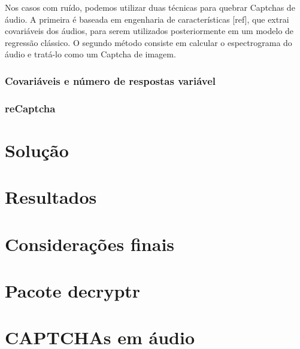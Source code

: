 \documentclass[12pt,]{report}
\begin{document}
Nos casos com ruído, podemos utilizar duas técnicas para quebrar
Captchas de áudio. A primeira é baseada em engenharia de características
{[}ref{]}, que extrai covariáveis dos áudios, para serem utilizados
posteriormente em um modelo de regressão clássico. O segundo método
consiste em calcular o espectrograma do áudio e tratá-lo como um Captcha
de imagem.

\subsection{Covariáveis e número de respostas
variável}\label{covariaveis-e-numero-de-respostas-variavel}

\subsection{reCaptcha}\label{recaptcha}

\chapter{Solução}\label{solucao}

\chapter{Resultados}\label{resultados}

\chapter{Considerações finais}\label{consideracoes-finais}

\chapter{Pacote decryptr}\label{pacote-decryptr}

\chapter{CAPTCHAs em áudio}\label{captchas-em-audio}


\end{document}
